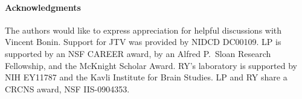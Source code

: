 \paragraph{Acknowledgments}

The authors would like to express appreciation for helpful discussions with Vincent Bonin.  Support for JTV was provided by NIDCD DC00109. LP is supported by an NSF CAREER award, by an Alfred P.\ Sloan Research Fellowship, and the McKnight Scholar Award. RY's laboratory is supported by NIH EY11787 and the Kavli Institute for Brain Studies. LP and RY share a CRCNS award, NSF IIS-0904353.



\appendix

\clearpage
 
% 
%
%

%

% 

